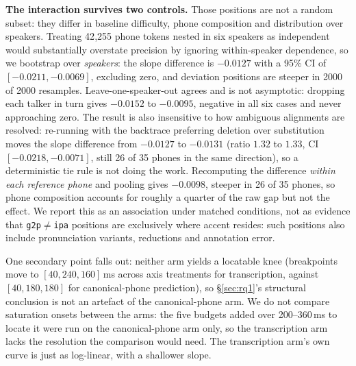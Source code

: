 \documentclass[journal]{IEEEtran}
\begin{document}
\textbf{The interaction survives two controls.} Those positions are not a
random subset: they differ in baseline difficulty, phone composition and
distribution over speakers. Treating 42{,}255 phone tokens nested in six
speakers as independent would substantially overstate precision by ignoring
within-speaker dependence, so we bootstrap over
\emph{speakers}: the slope difference is $-0.0127$ with a 95\% CI of
$[-0.0211, -0.0069]$, excluding zero, and deviation positions are steeper in
2000 of 2000 resamples. Leave-one-speaker-out agrees and is not asymptotic:
dropping each talker in turn gives $-0.0152$ to $-0.0095$, negative in all six
cases and never approaching zero. The result is also insensitive to how
ambiguous alignments are resolved: re-running with the backtrace preferring
deletion over substitution moves the slope difference from $-0.0127$ to
$-0.0131$ (ratio $1.32$ to $1.33$, CI $[-0.0218, -0.0071]$, still 26 of 35
phones in the same direction), so a deterministic tie rule is not doing the
work. Recomputing the difference \emph{within each reference
phone} and pooling gives $-0.0098$, steeper in 26 of 35 phones, so phone
composition accounts for roughly a quarter of the raw gap but not the effect.
We report this as an association under matched conditions, not as evidence
that \texttt{g2p}$\neq$\texttt{ipa} positions are exclusively where accent
resides: such positions also include pronunciation variants, reductions and
annotation error.

One secondary point falls out: neither arm yields a locatable knee
(breakpoints move to $[40, 240, 160]$\,ms across axis treatments for
transcription, against $[40, 180, 180]$ for canonical-phone prediction), so
\S\ref{sec:rq1}'s structural conclusion is not an artefact of the
canonical-phone arm. We do not compare saturation onsets between the arms: the five budgets
added over 200--360\,ms to locate it were run on the canonical-phone arm only, so
the transcription arm lacks the resolution the comparison would need. The
transcription arm's own curve is just as log-linear, with a shallower slope.
\end{document}
